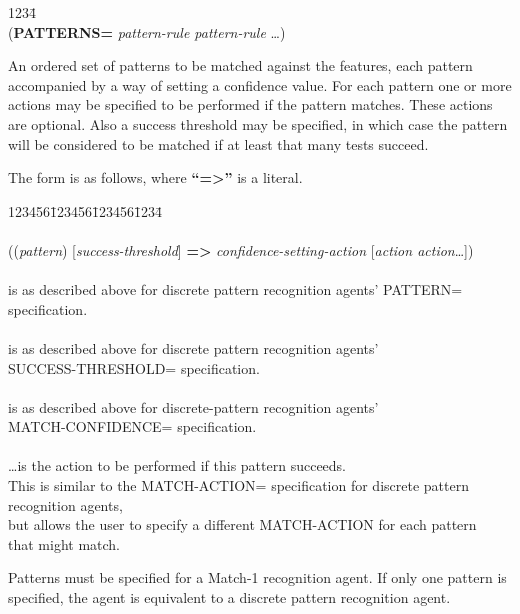 \begin{tabbing}
1234\= \kill
\\
({\bf PATTERNS=} {\it pattern-rule pattern-rule\/} \ldots)\\
\end{tabbing}
An ordered set of patterns to be matched against the features, each
pattern accompanied by a way of setting a confidence value.  For each
pattern one or more actions may be specified to be performed if the
pattern matches.  These actions are optional.  Also a success
threshold may be specified, in which case the pattern will be
considered to be matched if at least that many tests succeed.

The form is as follows, where {\bf ``=>''} is a literal.

\begin{tabbing}
123456\=123456\=123456\=1234\= \kill
\\
\\
\>\> (({\it pattern\/}) [{\it success-threshold\/}] {\bf =>}
{\it confidence-setting-action\/} [{\it action action}\ldots]) \\
\\
\> is as described above for discrete pattern 
recognition agents' PATTERN= \\
\>\>\>specification. \\
\\
\> is as described above for discrete
pattern recognition agents'\\
\>\>\> SUCCESS-THRESHOLD= specification. \\
\\
\> is as described above for
discrete-pattern recognition agents'\\
\>\>\> MATCH-CONFIDENCE= specification. \\
\\
\>\ldots is the action to be performed if this
pattern succeeds.\\
\>\>\>This is similar to the MATCH-ACTION= specification for discrete
pattern recognition agents,\\
\>\>\>but allows the user to specify a different MATCH-ACTION for each
pattern \\
\>\>\> that might match.
\\
\end{tabbing}
Patterns must be specified for a Match-1 recognition agent.  If only
one pattern is specified, the agent is equivalent to a discrete
pattern recognition agent.

